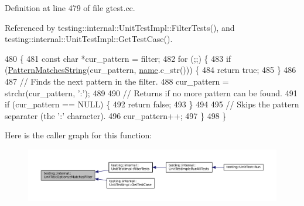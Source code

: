 Definition at line 479 of file gtest.\+cc.



Referenced by testing\+::internal\+::\+Unit\+Test\+Impl\+::\+Filter\+Tests(), and testing\+::internal\+::\+Unit\+Test\+Impl\+::\+Get\+Test\+Case().


\begin{DoxyCode}
480                                                \{
481   \textcolor{keyword}{const} \textcolor{keywordtype}{char} *cur\_pattern = filter;
482   \textcolor{keywordflow}{for} (;;) \{
483     \textcolor{keywordflow}{if} (\hyperlink{classtesting_1_1internal_1_1UnitTestOptions_af0235a2ee26dd6db21305e11d2358e4f}{PatternMatchesString}(cur\_pattern, \hyperlink{namespaceinteractive__marker_a447655961b3d3ca3c5a2a9d3d769436d}{name}.c\_str())) \{
484       \textcolor{keywordflow}{return} \textcolor{keyword}{true};
485     \}
486 
487     \textcolor{comment}{// Finds the next pattern in the filter.}
488     cur\_pattern = strchr(cur\_pattern, \textcolor{charliteral}{':'});
489 
490     \textcolor{comment}{// Returns if no more pattern can be found.}
491     \textcolor{keywordflow}{if} (cur\_pattern == NULL) \{
492       \textcolor{keywordflow}{return} \textcolor{keyword}{false};
493     \}
494 
495     \textcolor{comment}{// Skips the pattern separater (the ':' character).}
496     cur\_pattern++;
497   \}
498 \}
\end{DoxyCode}
Here is the caller graph for this function\+:
\nopagebreak
\begin{figure}[H]
\begin{center}
\leavevmode
\includegraphics[width=350pt]{classtesting_1_1internal_1_1UnitTestOptions_a67fc0adaffbb8d320b92e42e05017e4e_icgraph}
\end{center}
\end{figure}
\mbox{\label{classtesting_1_1internal_1_1UnitTestOptions_af0235a2ee26dd6db21305e11d2358e4f}} 
